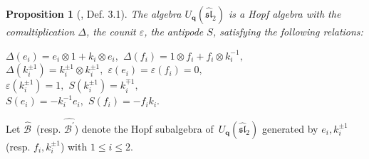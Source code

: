 \documentclass[12pt]{amsart}
\newtheorem{defi}[theorem]{Definition}
\newtheorem{proposition}[theorem]{Proposition}
\numberwithin{equation}{section}
\numberwithin{equation}{section}
\begin{document}
\begin{proposition}[\cite{HZhuang}, Def. 3.1]
The algebra \(U_{\textbf{q}}(\widehat{\mathfrak{sl}}_2)\) is a Hopf algebra with the comultiplication $\Delta$, the counit $\varepsilon$, the antipode $S$, satisfying the following relations:
\begin{tabenum}[(B1)]
\qquad\qquad\tabenumitem $\Delta(e_{i})= e_{i}\otimes 1+k_{i}\otimes e_{i},$\qquad
\tabenumitem 
$\Delta(f_{i})= 1\otimes f_i+f_i\otimes k^{-1}_{i},$\\ \tabenumitem 
$\Delta(k_i^{\pm1})= k_i^{\pm1}\otimes k_i^{\pm1},$
\tabenumitem $\varepsilon(e_{i})=\varepsilon(f_{i})=0,$\\
\tabenumitem $\varepsilon(k_i^{\pm1})=1,$
\tabenumitem $S(k_i^{\pm 1})=k_i^{\mp 1},$\\
\tabenumitem $S(e_{i})=-k_i^{-1}e_{i},$\quad
\tabenumitem $S(f_{i})=-f_{i}k_i.$
\end{tabenum}
\end{proposition}
Let \(\widehat{\mathcal{B}}\,\) 
 (resp. \(\widehat{\mathcal{B}^{\prime}}\)) denote the Hopf subalgebra of \(\,U_{\textbf{q}}(\widehat{\mathfrak{sl}}_2)\) generated by \(e_i,k^{\pm1}_i\,\) (resp. \(f_i, k^{\pm1}_i\)) with \(1\le i\le2\). 
\end{document}
